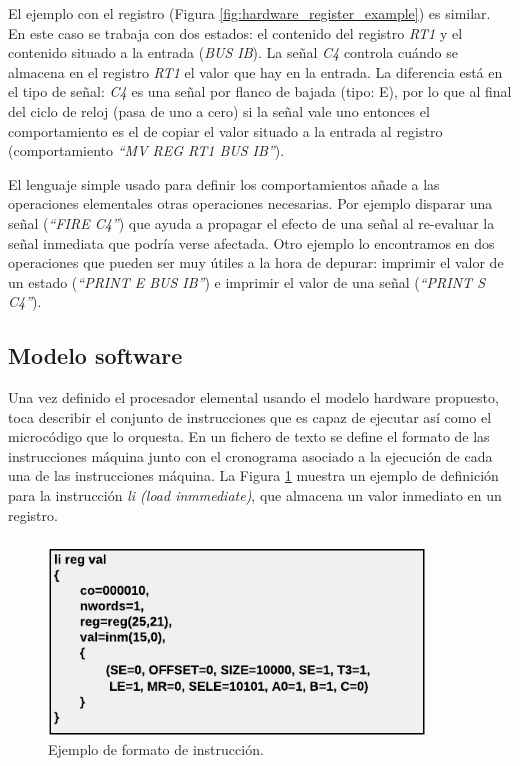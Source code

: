 El ejemplo con el registro (Figura \ref{fig:hardware_register_example}) es similar. En este caso se trabaja con dos estados: el contenido del registro \emph{RT1} y el contenido situado a la entrada (\emph{BUS IB}). La señal \emph{C4} controla cuándo se almacena en el registro \emph{RT1} el valor que hay en la entrada. La diferencia está en el tipo de señal: \emph{C4} es una señal por flanco de bajada (tipo: E), por lo que al final del ciclo de reloj (pasa de uno a cero) si la señal vale uno entonces el comportamiento es el de copiar el valor situado a la entrada al registro (comportamiento \emph{``MV REG RT1 BUS IB''}).

El lenguaje simple usado para definir los comportamientos añade a las operaciones elementales otras operaciones necesarias. Por ejemplo disparar una señal (\emph{``FIRE C4''}) que ayuda a propagar el efecto de una señal al re-evaluar la señal inmediata que podría verse afectada. Otro ejemplo lo encontramos en dos operaciones que pueden ser muy útiles a la hora de depurar: imprimir el valor de un estado (\emph{``PRINT E BUS IB''}) e imprimir el valor de una señal (\emph{``PRINT S C4''}).

\subsection{Modelo software}

Una vez definido el procesador elemental usando el modelo hardware propuesto, toca describir el conjunto de instrucciones que es capaz de ejecutar así como el microcódigo que lo orquesta. En un fichero de texto se define el formato de las instrucciones máquina junto con el cronograma asociado a la ejecución de cada una de las instrucciones máquina. La Figura \ref{fig:software_format_example} muestra un ejemplo de definición para la instrucción \emph{li (load inmmediate)}, que almacena un valor inmediato en un registro.

\begin{figure}[htbp]
 	\centering
 	\includegraphics[width=10cm]{figures/instruction_example}
 	\caption{Ejemplo de formato de instrucción.}
	\label{fig:software_format_example}
\end{figure}

